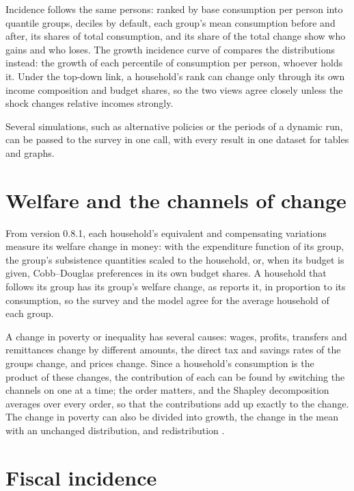 Incidence follows the same persons: ranked by base consumption per person
into quantile groups, deciles by default, each group's mean consumption
before and after, its shares of total consumption, and its share of the total
change show who gains and who loses. The growth incidence curve of
\citet{ravallion2003} compares the distributions instead: the growth of each
percentile of consumption per person, whoever holds it. Under the top-down
link, a household's rank can change only through its own income composition
and budget shares, so the two views agree closely unless the shock changes
relative incomes strongly.

Several simulations, such as alternative policies or the periods of a
dynamic run, can be passed to the survey in one call, with every result in one
dataset for tables and graphs.

\section{Welfare and the channels of change}

From version 0.8.1, each household's equivalent and compensating variations
measure its welfare change in money: with the expenditure function of its
group, the group's subsistence quantities scaled to the household, or, when
its budget is given, Cobb--Douglas preferences in its own budget shares. A
household that follows its group has its group's welfare change, as
 reports it, in proportion to its consumption, so the
survey and the model agree for the average household of each group.

A change in poverty or inequality has several causes: wages, profits,
transfers and remittances change by different amounts, the direct tax and
savings rates of the groups change, and prices change. Since a household's
consumption is the product of these changes, the contribution of each can be
found by switching the channels on one at a time; the order matters, and the
Shapley decomposition \citep{shorrocks2013} averages over every order, so that
the contributions add up exactly to the change. The change in poverty can
also be divided into growth, the change in the mean with an unchanged
distribution, and redistribution \citep{datt1992}.

\section{Fiscal incidence}

